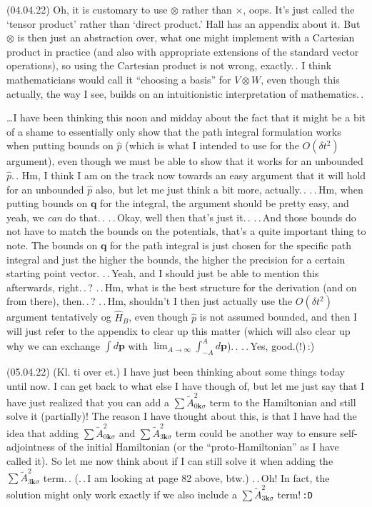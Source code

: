 \documentclass{report}
\begin{document}
(04.04.22) Oh, it is customary to use $\otimes$ rather than $\times$, oops. It's just called the `tensor product' rather than `direct product.' Hall has an appendix about it. But $\otimes$ is then just an abstraction over, what one might implement with a Cartesian product in practice (and also with appropriate extensions of the standard vector operations), so using the Cartesian product is not wrong, exactly.\,. I think mathematicians would call it ``choosing a basis'' for $V\otimes W$, even though this actually, the way I see, builds on an intuitionistic interpretation of mathematics.\,. 

\ldots I have been thinking this noon and midday about the fact that it might be a bit of a shame to essentially only show that the path integral formulation works when putting bounds on $\hat p$ (which is what I intended to use for the $O(\delta t^2)$ argument), even though we must be able to show that it works for an unbounded $\hat p$.\,. Hm, I think I am on the track now towards an easy argument that it will hold for an unbounded $\hat p$ also, but let me just think a bit more, actually.\,. .\,.\,Hm, when putting bounds on $\boldsymbol{q}$ for the integral, the argument should be pretty easy, and yeah, we \emph{can} do that.\,. .\,.\,Okay, well then that's just it.\,.  .\,.\,And those bounds do not have to match the bounds on the potentials, that's a quite important thing to note. The bounds on $\boldsymbol{q}$ for the path integral is just chosen for the specific path integral and just the higher the bounds, the higher the precision for a certain starting point vector. .\,.\,Yeah, and I should just be able to mention this afterwards, right.\,.\,? .\,.\,Hm, what is the best structure for the derivation (and on from there), then.\,.\,? .\,.\,Hm, shouldn't I then just actually use the $O(\delta t^2)$ argument tentatively og $\hat H_B$, even though $\hat p$ is not assumed bounded, and then I will just refer to the appendix to clear up this matter (which will also clear up why we can exchange $\int d\boldsymbol{p}$ with $\lim_{A \to \infty} \int_{-A}^{A} d\boldsymbol{p}$).\,. .\,.\,Yes, good.(!)\,:)


(05.04.22) (Kl. ti over et.) I have just been thinking about some things today until now. I can get back to what else I have though of, but let me just say that I have just realized that you can add a $\sum \tilde{A}_{0\boldsymbol{k}\sigma}^2$ term to the Hamiltonian and still solve it (partially)! The reason I have thought about this, is that I have had the idea that adding $\sum \tilde{A}_{0\boldsymbol{k}\sigma}^2$ and $\sum \tilde{A}_{3\boldsymbol{k}\sigma}^2$ term could be another way to ensure self-adjointness of the initial Hamiltonian (or the ``proto-Hamiltonian'' as I have called it). So let me now think about if I can still solve it when adding the $\sum \tilde{A}_{3\boldsymbol{k}\sigma}^2$ term.\,. (.\,.\,I am looking at page 82 above, btw.)
.\,.\,Oh! In fact, the solution might only work exactly if we also include a 
$\sum \tilde{A}_{3\boldsymbol{k}\sigma}^2$ term!\,\texttt{:D} %
\end{document}
